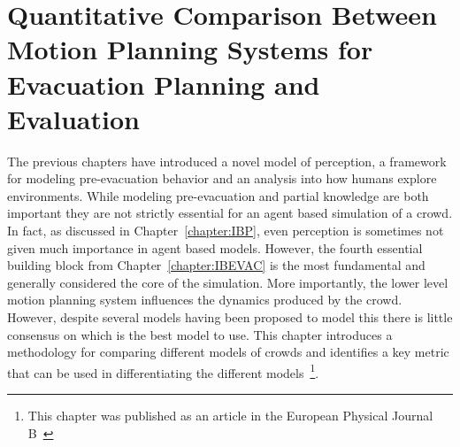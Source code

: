 
\chapter{Quantitative Comparison Between Motion Planning Systems for Evacuation Planning and Evaluation}
\label{chapter:MotionPlannerComparison}

The previous chapters have introduced a novel model of perception, a framework for modeling pre-evacuation behavior and an analysis into how humans explore environments. While modeling pre-evacuation and partial knowledge are both important they are not strictly essential for an agent based simulation of a crowd. In fact, as discussed in Chapter~\ref{chapter:IBP}, even perception is sometimes not given much importance in agent based models. However, the fourth essential building block from Chapter~\ref{chapter:IBEVAC} is the most fundamental and generally considered the core of the simulation. More importantly, the lower level motion planning system influences the dynamics produced by the crowd. However, despite several models having been proposed to model this there is little consensus on which is the best model to use. This chapter introduces a methodology for comparing different models of crowds and identifies a key metric that can be used in differentiating the different models~\footnote{This chapter was published as an article in the European Physical Journal B~\cite{Viswanathan2014}}.

%

